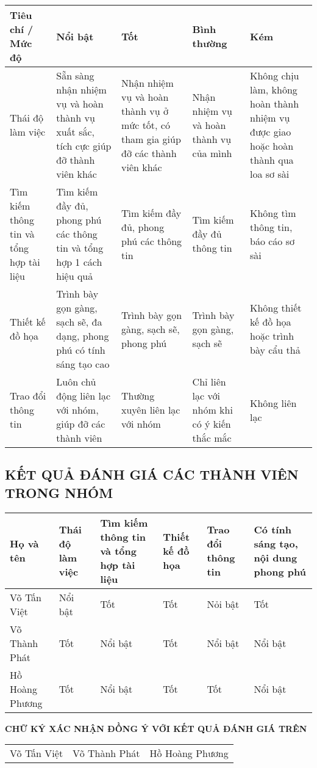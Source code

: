 \documentclass[a4paper,12pt]{article}
\begin{document}
    \begin{center}
        \begin{tabular}{ | m{2.5cm} | m{2.95cm} | m{2.95cm} | m{2.95cm} | m{2.95cm} |}
            \hline
            Tiêu chí / Mức độ & Nổi bật & Tốt & Bình thường & Kém \\
            \hline
            Thái độ làm việc & Sẵn sàng nhận nhiệm vụ và hoàn thành vụ xuất sắc, tích cực giúp đỡ thành viên khác & Nhận nhiệm vụ và hoàn thành vụ ở mức tốt, có tham gia giúp đỡ các thành viên khác & Nhận nhiệm vụ và hoàn thành vụ của mình & Không chịu làm, không hoàn thành nhiệm vụ được giao hoặc hoàn thành qua loa sơ sài \\
            \hline
            Tìm kiếm thông tin và tổng hợp tài liệu & Tìm kiếm đầy đủ, phong phú các thông tin và tổng hợp 1 cách hiệu quả & Tìm kiếm đầy đủ, phong phú các thông tin & Tìm kiếm đầy đủ thông tin & Không tìm thông tin, báo cáo sơ sài \\
            \hline
            Thiết kế đồ họa & Trình bày gọn gàng, sạch sẽ, đa dạng, phong phú có tính sáng tạo cao & Trình bày gọn gàng, sạch sẽ, phong phú & Trình bày gọn gàng, sạch sẽ & Không thiết kế đồ họa hoặc trình bày cẩu thả \\
            \hline
            Trao đổi thông tin & Luôn chủ động liên lạc với nhóm, giúp đỡ các thành viên & Thường xuyên liên lạc với nhóm & Chỉ liên lạc với nhóm khi có ý kiến thắc mắc & Không liên lạc \\
            \hline
        \end{tabular}
    \end{center}
    
    \subsection {KẾT QUẢ ĐÁNH GIÁ CÁC THÀNH VIÊN TRONG NHÓM}
    \begin{center}
        \begin{tabular}{ | m{2.5cm} | m{2.25cm} | m{2.5cm} | m{2.25cm} | m{2.25cm} | m{2.5cm} |}
            \hline
            Họ và tên & Thái độ làm việc & Tìm kiếm thông tin và tổng hợp tài liệu & Thiết kế đồ họa & Trao đổi thông tin & Có tính sáng tạo, nội dung phong phú \\
            \hline
            Võ Tấn Việt & Nổi bật & Tốt & Tốt & Nỏi bật & Tốt  \\
            \hline
            Võ Thành Phát & Tốt & Nổi bật & Tốt & Nổi bật & Nổi bật \\
            \hline
            Hồ Hoàng Phương & Tốt & Nổi bật & Tốt & Tốt & Nổi bật \\
            \hline
        \end{tabular}
    \end{center}
    
\centerline{\textbf{CHỮ KÝ XÁC NHẬN ĐỒNG Ý VỚI KẾT QUẢ ĐÁNH GIÁ TRÊN}}

\begin{tabular}{m{5cm} m{5cm} m{5cm}}
    Võ Tấn Việt  &  Võ Thành Phát  &  Hồ Hoàng Phương \\
\end{tabular}
\end{document}

